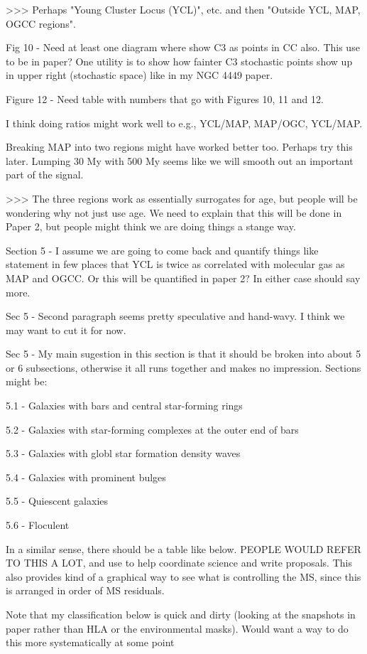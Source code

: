 >>> Perhaps "Young Cluster Locus (YCL)", etc. and then "Outside YCL, MAP, OGCC regions".
 
 
Fig 10 - Need at least one diagram where show C3 as points in CC also. This use to be in paper? One utility is to show how fainter C3 stochastic points show up in upper right (stochastic space) like in my NGC 4449 paper.
 
 
Figure 12 - Need table with numbers that go with Figures 10, 11 and 12.
 
 
I think doing ratios might work well to e.g., YCL/MAP,  MAP/OGC, YCL/MAP.
 
 
Breaking MAP into two regions might have worked better too. Perhaps try this later. Lumping 30 My with 500 My seems like we will smooth out an important part of the signal.
 
 
>>> The three regions work  as essentially surrogates for age, but people will be wondering why not just use age. We need to explain that this will be done in Paper 2, but people might think we are doing things a stange way.
 
 
Section 5  -  I assume we are going to come back and quantify things like statement in few places that YCL is twice as correlated with molecular  gas as MAP and OGCC. Or this will be quantified in paper 2? In either case should say more. 
 
 
Sec 5 - Second  paragraph seems pretty speculative and hand-wavy. I think we may want to cut it for now.
 
 
Sec 5 - My main sugestion in this section is that it should be broken into about 5 or 6 subsections, otherwise it all runs together and makes no impression. Sections might be:
 
5.1 - Galaxies with bars and central star-forming rings
 
5.2 - Galaxies with star-forming complexes at the outer end of bars
 
5.3 - Galaxies with globl star formation density waves
 
5.4 - Galaxies with prominent bulges
 
5.5 - Quiescent galaxies
 
5.6 - Floculent
 
 
In a similar sense, there should be a table like below. PEOPLE WOULD REFER TO THIS A LOT, and use to help coordinate science and write proposals. This also provides kind of a graphical way to see what is controlling the MS, since this is arranged in order of MS residuals.
 
Note that my classification below is quick and dirty (looking at the snapshots in paper rather than HLA or the environmental masks). Would want a way to do this more systematically at some point
 
